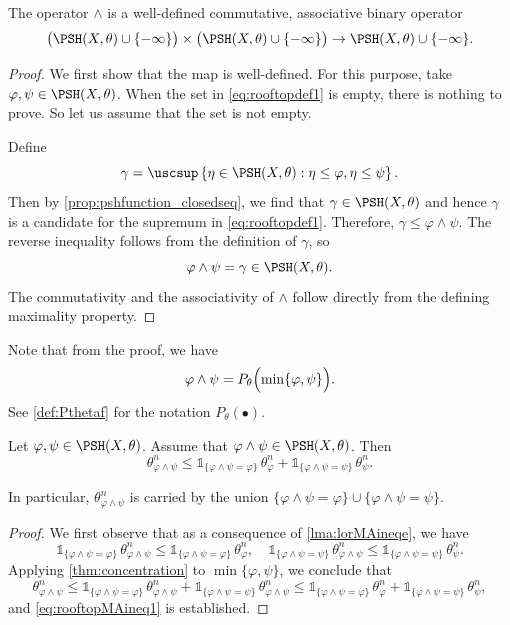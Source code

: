 \begin{proposition}\label{prop:land_well_def}
    The operator $\land$ is a well-defined commutative, associative binary operator
    \[
    \bigl(\PSH(X,\theta)\cup\{-\infty\}\bigr)\times\bigl(\PSH(X,\theta)\cup\{-\infty\}\bigr)\rightarrow \PSH(X,\theta)\cup\{-\infty\}.
    \]
\end{proposition}
\begin{proof}
    We first show that the map is well-defined. For this purpose, take $\varphi,\psi\in \PSH(X,\theta)$. When the set in \eqref{eq:rooftopdef1} is empty, there is nothing to prove. So let us assume that the set is not empty.

    Define
    \[
    \gamma=\uscsup \left\{\eta\in \PSH(X,\theta):\eta\leq \varphi,\eta\leq \psi\right\}.
    \]
    Then by \cref{prop:pshfunction_closedseq}, we find that $\gamma\in \PSH(X,\theta)$ and hence $\gamma$ is a candidate for the supremum in \eqref{eq:rooftopdef1}. Therefore, $\gamma\leq \varphi\land \psi$. The reverse inequality follows from the definition of $\gamma$, so
    \[
    \varphi\land \psi=\gamma\in \PSH(X,\theta).
    \]
    The commutativity and the associativity of $\land$ follow directly from the defining maximality property.
\end{proof}
Note that from the proof, we have
\[
\varphi\land \psi=P_{\theta}\Bigl( \min\{\varphi,\psi\} \Bigr).
\]
See \cref{def:Pthetaf} for the notation $P_{\theta}(\bullet)$.


\begin{lemma}\label{lma:rooftopMA}
    Let $\varphi,\psi\in \PSH(X,\theta)$. Assume that $\varphi\land\psi\in \PSH(X,\theta)$. Then
    \begin{equation}\label{eq:rooftopMAineq1}
    \theta_{\varphi\land \psi}^n\leq \mathds{1}_{\{\varphi\land\psi=\varphi\}}\, \theta_{\varphi}^n+\mathds{1}_{\{\varphi\land\psi=\psi\}} \,\theta_{\psi}^n.
    \end{equation}
\end{lemma}
In particular, $\theta_{\varphi\land \psi}^n$ is carried by the union $\{\varphi\land \psi=\varphi\}\cup \{\varphi\land \psi=\psi\}$.

\begin{proof}
We first observe that as a consequence of \cref{lma:lorMAineqe}, we have
\[
\mathds{1}_{\{\varphi\land \psi=\varphi\}} \,\theta_{\varphi\land \psi}^n\leq \mathds{1}_{\{\varphi\land \psi=\varphi\}} \,\theta_{\varphi}^n,\quad \mathds{1}_{\{\varphi\land \psi=\psi\}} \,\theta_{\varphi\land \psi}^n\leq \mathds{1}_{\{\varphi\land \psi=\psi\}} \,\theta_{\psi}^n.
\]
Applying \cref{thm:concentration} to $\min\{\varphi,\psi\}$, we conclude that
\[
\theta_{\varphi\land \psi}^n\leq \mathds{1}_{\{\varphi\land \psi=\varphi\}} \,\theta_{\varphi\land \psi}^n+\mathds{1}_{\{\varphi\land \psi=\psi\}}\,\theta_{\varphi\land \psi}^n\leq \mathds{1}_{\{\varphi\land\psi=\varphi\}} \,\theta_{\varphi}^n+\mathds{1}_{\{\varphi\land\psi=\psi\}} \,\theta_{\psi}^n,
\]
and \eqref{eq:rooftopMAineq1} is established.
\end{proof}



